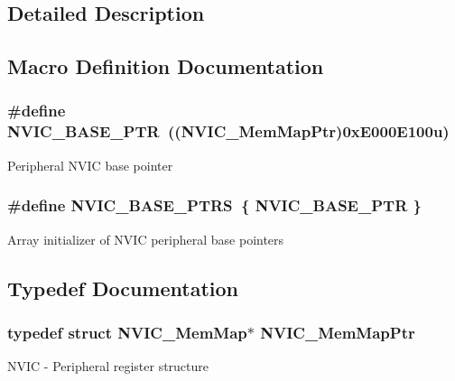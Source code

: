\subsection{Detailed Description}


\subsection{Macro Definition Documentation}
\hypertarget{group___n_v_i_c___peripheral_ga28f0a055d0c218e16d1fc7b13ff0caa5}{}
\subsubsection[{N\+V\+I\+C\+\_\+\+B\+A\+S\+E\+\_\+\+P\+T\+R}]{\setlength{\rightskip}{0pt plus 5cm}\#define N\+V\+I\+C\+\_\+\+B\+A\+S\+E\+\_\+\+P\+T\+R~(({\bf N\+V\+I\+C\+\_\+\+Mem\+Map\+Ptr})0x\+E000\+E100u)}\label{group___n_v_i_c___peripheral_ga28f0a055d0c218e16d1fc7b13ff0caa5}
Peripheral N\+V\+I\+C base pointer \hypertarget{group___n_v_i_c___peripheral_ga25b6ce0c871e09199e515cbb1716fe26}{}
\subsubsection[{N\+V\+I\+C\+\_\+\+B\+A\+S\+E\+\_\+\+P\+T\+R\+S}]{\setlength{\rightskip}{0pt plus 5cm}\#define N\+V\+I\+C\+\_\+\+B\+A\+S\+E\+\_\+\+P\+T\+R\+S~\{ {\bf N\+V\+I\+C\+\_\+\+B\+A\+S\+E\+\_\+\+P\+T\+R} \}}\label{group___n_v_i_c___peripheral_ga25b6ce0c871e09199e515cbb1716fe26}
Array initializer of N\+V\+I\+C peripheral base pointers 

\subsection{Typedef Documentation}
\hypertarget{group___n_v_i_c___peripheral_ga685d87c766bb24fb3330aa8cc48fa0e7}{}
\subsubsection[{N\+V\+I\+C\+\_\+\+Mem\+Map\+Ptr}]{\setlength{\rightskip}{0pt plus 5cm}typedef struct {\bf N\+V\+I\+C\+\_\+\+Mem\+Map}$\ast$ {\bf N\+V\+I\+C\+\_\+\+Mem\+Map\+Ptr}}\label{group___n_v_i_c___peripheral_ga685d87c766bb24fb3330aa8cc48fa0e7}
N\+V\+I\+C -\/ Peripheral register structure 